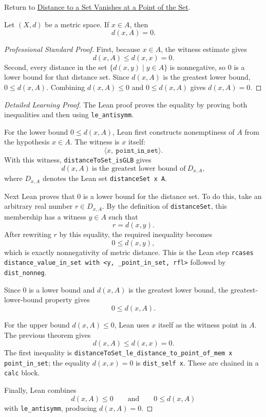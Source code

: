 \newpage
{}
\label{prf:fv-msml-distance-to-set-eq-zero-of-mem}

\begin{remark*}[Return]
Return to \hyperref[thm:fv-msml-distance-to-set-eq-zero-of-mem]{Distance to a Set Vanishes at a Point of the Set}.
\end{remark*}

\begin{theorem*}
Let $(X,d)$ be a metric space. If \(x\in A\), then
\[
  d(x,A)=0.
\]
\end{theorem*}

\begin{proof}[Professional Standard Proof]
\LRAProofBodyStart
First, because \(x\in A\), the witness estimate gives
\[
  d(x,A)\leq d(x,x)=0.
\]
Second, every distance in the set \(\{d(x,y)\mid y\in A\}\) is nonnegative, so
\(0\) is a lower bound for that distance set. Since \(d(x,A)\) is the greatest
lower bound, \(0\leq d(x,A)\). Combining \(d(x,A)\leq0\) and
\(0\leq d(x,A)\) gives \(d(x,A)=0\).
\end{proof}

\begin{proof}[Detailed Learning Proof]
\LRAProofBodyStart
The Lean proof proves the equality by proving both inequalities and then using
\texttt{le\_antisymm}.

For the lower bound \(0\leq d(x,A)\), Lean first constructs nonemptiness of
\(A\) from the hypothesis \(x\in A\). The witness is \(x\) itself:
\[
  \langle x,\ \texttt{point\_in\_set}\rangle.
\]
With this witness, \texttt{distanceToSet\_isGLB} gives
\[
  d(x,A)\ \text{is the greatest lower bound of}\ D_{x,A},
\]
where \(D_{x,A}\) denotes the Lean set \texttt{distanceSet x A}.

Next Lean proves that \(0\) is a lower bound for the distance set. To do this,
take an arbitrary real number \(r\in D_{x,A}\). By the definition of
\texttt{distanceSet}, this membership has a witness
\(y\in A\) such that
\[
  r=d(x,y).
\]
After rewriting \(r\) by this equality, the required inequality becomes
\[
  0\leq d(x,y),
\]
which is exactly nonnegativity of metric distance. This is the Lean step
\texttt{rcases distance\_value\_in\_set with <y, \_point\_in\_set, rfl>}
followed by \texttt{dist\_nonneg}.

Since \(0\) is a lower bound and \(d(x,A)\) is the greatest lower bound, the
greatest-lower-bound property gives
\[
  0\leq d(x,A).
\]

For the upper bound \(d(x,A)\leq 0\), Lean uses \(x\) itself as the witness
point in \(A\). The previous theorem gives
\[
  d(x,A)\leq d(x,x)=0.
\]
The first inequality is
\texttt{distanceToSet\_le\_distance\_to\_point\_of\_mem x point\_in\_set};
the equality \(d(x,x)=0\) is \texttt{dist\_self x}. These are chained in a
\texttt{calc} block.

Finally, Lean combines
\[
  d(x,A)\leq 0
  \qquad\text{and}\qquad
  0\leq d(x,A)
\]
with \texttt{le\_antisymm}, producing \(d(x,A)=0\).
\end{proof}


